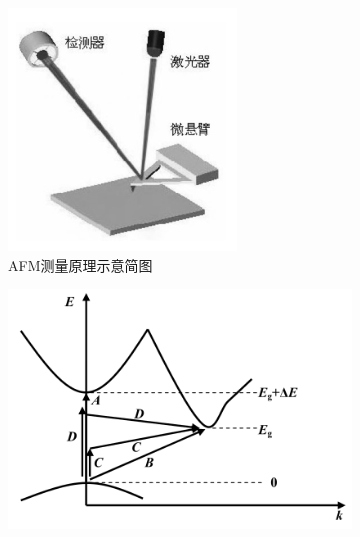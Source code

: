 \documentclass{ctexart}
\begin{document}
\begin{figure}[htbp]
  \centering
  \begin{subfigure}{.25\textwidth}
    \centering
    \includegraphics[width=\linewidth]{figures/AFM}
    \caption{AFM测量原理示意简图}
  \end{subfigure}
  \begin{subfigure}{.35\textwidth}
    \centering
    \includegraphics[width=\linewidth]{figures/禁戒的代间直接跃迁}

\end{subfigure}
\end{figure}
\end{document}
